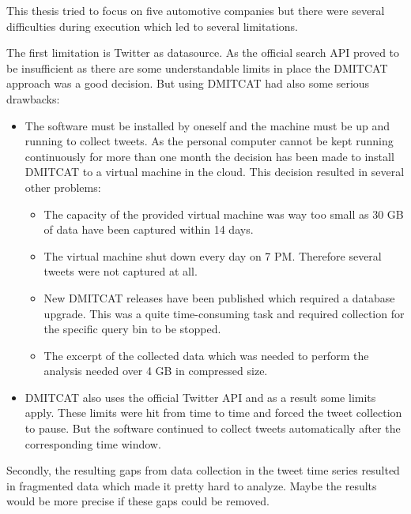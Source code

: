 This thesis tried to focus on five automotive companies but there were several difficulties during execution which led to several limitations.

The first limitation is Twitter as datasource.
As the official search \ac{API} proved to be insufficient as there are some understandable limits in place the \ac{DMITCAT} approach was a good decision.
But using \ac{DMITCAT} had also some serious drawbacks:

\begin{itemize}
    \item 
        The software must be installed by oneself and the machine must be up and running to collect tweets.
        As the personal computer cannot be kept running continuously for more than one month the decision has been made to install \ac{DMITCAT} to a virtual machine in the cloud.
        This decision resulted in several other problems:

        \begin{itemize}
            \item 
                The capacity of the provided virtual machine was way too small as 30 \ac{GB} of data have been captured within 14 days.
            \item 
                The virtual machine shut down every day on 7 PM. 
                Therefore several tweets were not captured at all.
            \item 
                New \ac{DMITCAT} releases have been published which required a database upgrade.
                This was a quite time-consuming task and required collection for the specific query bin to be stopped.

            \item
                The excerpt of the collected data which was needed to perform the analysis needed over 4 \ac{GB} in compressed size.
        \end{itemize}

    \item
        \ac{DMITCAT} also uses the official Twitter \ac{API} and as a result some limits apply.
        These limits were hit from time to time and forced the tweet collection to pause.
        But the software continued to collect tweets automatically after the corresponding time window.
\end{itemize}

Secondly, the resulting gaps from data collection in the tweet time series resulted in fragmented data which made it pretty hard to analyze.
Maybe the results would be more precise if these gaps could be removed.

